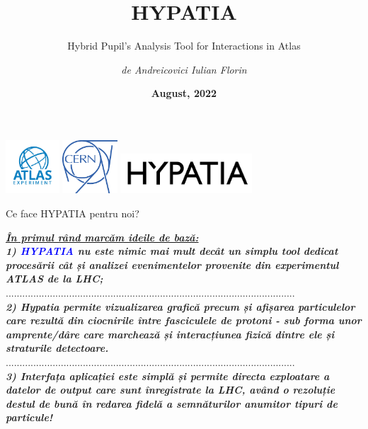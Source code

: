 \documentclass{beamer}
\author[by Iulian]{ \textit{de Andreicovici Iulian Florin}}
\institute[UPB]{\large \textbf{Universitatea Politehnica din București}\\ 
\vspace{2mm} FSA \\ IF-1334 }
\title[Inginerie soft]{\textbf{HYPATIA}}
\subtitle{Hybrid Pupil's Analysis Tool for Interactions in Atlas}
\date[Aplicație experimentală.]{\textbf{August, 2022}}
\begin{document}
\begin{frame}
	\titlepage
	\begin{center}
		\includegraphics[height=2cm]{files/channels4_profile.jpg}
		\includegraphics[height=2cm]{files/cern.jpg}
  	\includegraphics[height=1.5cm]{files/LOGO_HYPATIA_web.png}
	\end{center}
\end{frame}




\begin{frame}{Ce face HYPATIA pentru noi?}

\underline{\textit{\textbf{În primul rând marcăm ideile de bază:}}}\\
\vspace{0.2cm}
\makebox[1cm]{} \textit{{\textbf{1) \textcolor{blue}{HYPATIA} nu este nimic mai mult decât un simplu tool dedicat procesării cât și analizei evenimentelor provenite din experimentul ATLAS de la LHC;}}}\\
.........................................................................................................\\
\makebox[1cm]{} \textit{\textbf{2) Hypatia permite vizualizarea grafică precum și afișarea particulelor care rezultă din ciocnirile între fasciculele de protoni - sub forma unor amprente/dâre care marchează și interacțiunea fizică dintre ele și straturile detectoare.}}\\
.........................................................................................................\\
\makebox[1cm]{} \textit{\textbf{3) Interfața aplicației este simplă și permite directa exploatare a datelor de output care sunt înregistrate la LHC, având o rezoluție destul de bună în redarea fidelă a semnăturilor anumitor tipuri de particule!}}

\end{frame}
\end{document}
